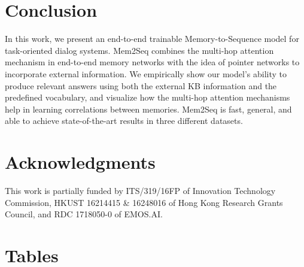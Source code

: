 \documentclass[11pt,a4paper]{article}
\begin{document}
\section{Conclusion}
In this work, we present an end-to-end trainable Memory-to-Sequence model for task-oriented dialog systems. Mem2Seq combines the multi-hop attention mechanism in end-to-end memory networks with the idea of pointer networks to incorporate external information. We empirically show our model's ability to produce relevant answers using both the external KB information and the predefined vocabulary, and visualize how the multi-hop attention mechanisms help in learning correlations between memories. Mem2Seq is fast, general, and able to achieve state-of-the-art results in three different datasets.

\section*{Acknowledgments}
This work is partially funded by ITS/319/16FP of Innovation Technology Commission, HKUST 16214415 \& 16248016 of Hong Kong Research Grants Council, and RDC 1718050-0 of
EMOS.AI.





\onecolumn

\section{Tables}
\end{document}

